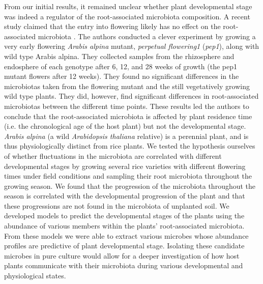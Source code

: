 From our initial results, it remained unclear whether plant developmental stage was indeed a regulator of the root-associated microbiota composition. A recent study claimed that the entry into flowering likely has no effect on the root-associated microbiota \cite{Dombrowski2016}. The authors conducted a clever experiment by growing a very early flowering \textit{Arabis alpina} mutant, \textit{perpetual flowering1} (\textit{pep1})\cite{Wang2009}, along with wild type Arabis alpina. They collected samples from the rhizosphere and endosphere of each genotype after 6, 12, and 28 weeks of growth (the pep1 mutant flowers after 12 weeks). They found no significant differences in the microbiotas taken from the flowering mutant and the still vegetatively growing wild type plants. They did, however, find significant differences in root-associated microbiotas between the different time points. These results led the authors to conclude that the root-associated microbiota is affected by plant residence time (i.e. the chronological age of the host plant) but not the developmental stage. \textit{Arabis alpina} (a wild \textit{Arabidopsis thaliana} relative) is a perennial plant, and is thus physiologically distinct from rice plants. We tested the hypothesis ourselves of whether fluctuations in the microbiota are correlated with different developmental stages by growing several rice varieties with different flowering times under field conditions and sampling their root microbiota throughout the growing season. We found that the progression of the microbiota throughout the season is correlated with the developmental progression of the plant and that these progressions are not found in the microbiota of unplanted soil. We developed models to predict the developmental stages of the plants using the abundance of various members within the plants' root-associated microbiota. From these models we were able to extract various microbes whose abundance profiles are predictive of plant developmental stage. Isolating these candidate microbes in pure culture would allow for a deeper investigation of how host plants communicate with their microbiota during various developmental and physiological states.

